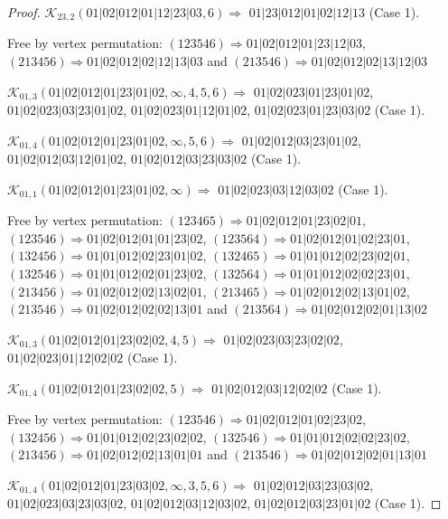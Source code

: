 \documentclass[12pt]{article}
\theoremstyle{plain}
\theoremstyle{definition}
\theoremstyle{remark}
\newcommand{\fancy}[1]{\mathcal{#1}}
\def\K{\fancy{K}}
\begin{document}
\begin{proof}
	$\K_{23,2}(01|02|012|01|12|23|03,6)\Rightarrow $ $01|23|012|01|02|12|13$ (Case 1).
	
	
	
	Free by vertex permutation: $(1 2 3 5 4 6)\Rightarrow 01|02|012|01|23|12|03$, $(2 1 3 4 5 6)\Rightarrow 01|02|012|02|12|13|03$ and $(2 1 3 5 4 6)\Rightarrow 01|02|012|02|13|12|03$
	
	
	
	\bigskip
	
	$\K_{01,3}(01|02|012|01|23|01|02,\infty,4, 5, 6)\Rightarrow $ $01|02|023|01|23|01|02$, $01|02|023|03|23|01|02$, $01|02|023|01|12|01|02$, $01|02|023|01|23|03|02$ (Case 1).
	
	$\K_{01,4}(01|02|012|01|23|01|02,\infty,5, 6)\Rightarrow $ $01|02|012|03|23|01|02$, $01|02|012|03|12|01|02$, $01|02|012|03|23|03|02$ (Case 1).
	
	$\K_{01,1}(01|02|012|01|23|01|02,\infty)\Rightarrow $ $01|02|023|03|12|03|02$ (Case 1).
	
	
	
	Free by vertex permutation: $(1 2 3 4 6 5)\Rightarrow 01|02|012|01|23|02|01$, $(1 2 3 5 4 6)\Rightarrow 01|02|012|01|01|23|02$, $(1 2 3 5 6 4)\Rightarrow 01|02|012|01|02|23|01$, $(1 3 2 4 5 6)\Rightarrow 01|01|012|02|23|01|02$, $(1 3 2 4 6 5)\Rightarrow 01|01|012|02|23|02|01$, $(1 3 2 5 4 6)\Rightarrow 01|01|012|02|01|23|02$, $(1 3 2 5 6 4)\Rightarrow 01|01|012|02|02|23|01$, $(2 1 3 4 5 6)\Rightarrow 01|02|012|02|13|02|01$, $(2 1 3 4 6 5)\Rightarrow 01|02|012|02|13|01|02$, $(2 1 3 5 4 6)\Rightarrow 01|02|012|02|02|13|01$ and $(2 1 3 5 6 4)\Rightarrow 01|02|012|02|01|13|02$
	
	
	
	\bigskip
	
	$\K_{01,3}(01|02|012|01|23|02|02,4, 5)\Rightarrow $ $01|02|023|03|23|02|02$, $01|02|023|01|12|02|02$ (Case 1).
	
	$\K_{01,4}(01|02|012|01|23|02|02,5)\Rightarrow $ $01|02|012|03|12|02|02$ (Case 1).
	
	
	
	Free by vertex permutation: $(1 2 3 5 4 6)\Rightarrow 01|02|012|01|02|23|02$, $(1 3 2 4 5 6)\Rightarrow 01|01|012|02|23|02|02$, $(1 3 2 5 4 6)\Rightarrow 01|01|012|02|02|23|02$, $(2 1 3 4 5 6)\Rightarrow 01|02|012|02|13|01|01$ and $(2 1 3 5 4 6)\Rightarrow 01|02|012|02|01|13|01$
	
	
	
	\bigskip
	
	$\K_{01,4}(01|02|012|01|23|03|02,\infty,3, 5, 6)\Rightarrow $ $01|02|012|03|23|03|02$, $01|02|023|03|23|03|02$, $01|02|012|03|12|03|02$, $01|02|012|03|23|01|02$ (Case 1).
	

\end{proof}
\end{document}
